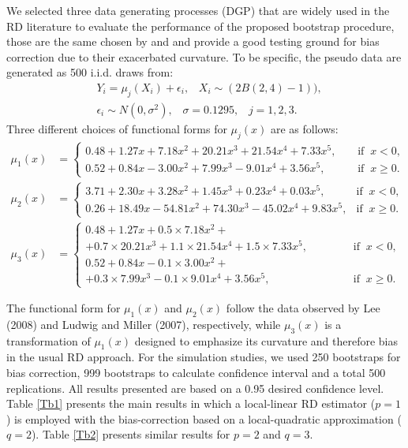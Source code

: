 \documentclass[12pt,fleqn]{article}
\begin{document}
We selected three data generating processes (DGP) that are widely used in the RD literature to evaluate the performance of the proposed bootstrap procedure, those are the same chosen by \cite{calonico2014} and \cite{IK} and provide a good testing ground for bias correction due to their exacerbated curvature. To be specific, the pseudo data are generated as 500 i.i.d. draws from:
\begin{align*}
& Y_{i} = \mu_{j}(X_{i}) + \epsilon_{i}, \;\;\; X_{i} \sim  (2 B (2,4) - 1)), \\
& \epsilon_{i} \sim N(0, \sigma^{2}), \;\;\; \sigma = 0.1295, \;\;\; j = 1,2,3.
\end{align*}
Three different choices of functional forms for $\mu_{j}(x)$ are as follows:
\begin{align}
\mu_{1}(x) & = 
\begin{cases}
0.48 + 1.27x + 7.18x^{2} + 20.21x^{3} + 21.54x^{4} + 7.33x^{5}, \;\;\;\; & \text{if} \;\; x < 0, \\
0.52 + 0.84x - 3.00x^{2} + 7.99x^3 - 9.01x^4 + 3.56x^{5},  & \text{if} \;\; x \ge 0.
\end{cases}
\\
\mu_{2}(x) & = 
\begin{cases}
3.71 + 2.30x + 3.28x^2 + 1.45x^3 + 0.23x^4 + 0.03x^5, \;\; & \text{if} \;\; x < 0, \\
0.26 + 18.49x - 54.81x^2 + 74.30x^3 - 45.02x^4 + 9.83x^5,  & \text{if} \;\; x \ge 0.
\end{cases}
\\
\mu_{3}(x) & =
\begin{cases}
0.48 + 1.27x + 0.5 \times 7.18x^{2}+ \\
+ 0.7 \times 20.21x^3 + 1.1 \times 21.54x^4 + 1.5 \times 7.33x^5, \;\;\;\;\;\;\;\;\;\;\;\; & \text{if} \;\; x < 0, \\
0.52 + 0.84x - 0.1 \times 3.00x^{2}+ \\
+ 0.3 \times 7.99x^3 - 0.1 \times 9.01x^4 + 3.56x^5, & \text{if} \;\; x \ge 0.
\end{cases}
\end{align}

The functional form for $\mu_{1}(x)$ and $\mu_{2}(x)$ follow the data observed by Lee (2008) and Ludwig and Miller (2007), respectively, while $\mu_{3}(x)$ is a transformation of $\mu_{1}(x)$ designed to emphasize its curvature and therefore bias in the usual RD approach. For the simulation studies, we used 250 bootstraps for bias correction, 999 bootstraps to calculate confidence interval and a total 500 replications. All results presented are based on a 0.95 desired confidence level. Table \ref{Tb1} presents the main results in which a local-linear RD estimator ($p=1$) is employed with the bias-correction based on a local-quadratic approximation ($q=2$). Table \ref{Tb2} presents similar results for $p=2$ and $q=3$.
\end{document}
